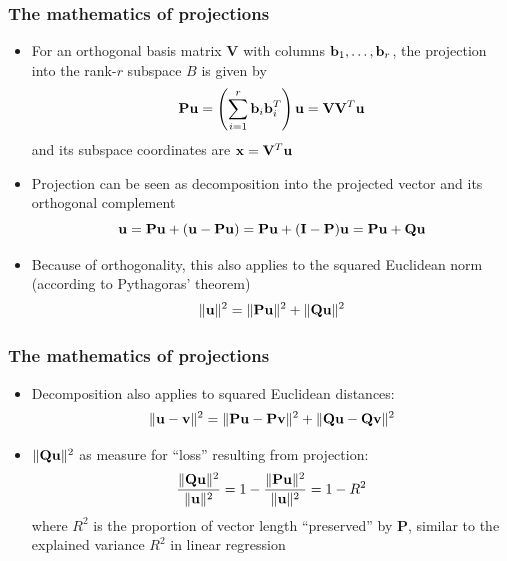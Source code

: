 \documentclass[t]{beamer} %
\begin{document}
\begin{frame}
  \frametitle{The mathematics of projections}

  \begin{itemize}
  \item For an orthogonal basis matrix $\mathbf{V}$ with columns
    $\vb_1, \ldots, \vb_r$, the projection into the rank-$r$ subspace $B$ is
    given by
    \[
      \mathbf{P}\vu = \left(\sum_{i=1}^r \vb_i \vb_i^T\right) \vu
      = \mathbf{V} \mathbf{V}^T \vu
    \]
    and its subspace coordinates are $\vx = \mathbf{V}^T \mathbf{u}$
  \item<2-> Projection can be seen as decomposition into the projected vector
    and its orthogonal complement
    \[
      \vu = \mathbf{P} \vu + (\vu - \mathbf{P} \vu)
      = \mathbf{P} \vu + (\mathbf{I} - \mathbf{P}) \vu
      = \mathbf{P} \vu + \mathbf{Q} \vu
    \]
  \item<3-> Because of orthogonality, this also applies to the squared
    Euclidean norm (according to Pythagoras' theorem)
    \[
      \norm{\vu}^2 = \norm{\mathbf{P} \vu}^2 + \norm{\mathbf{Q} \vu}^2
    \]
  \end{itemize}
\end{frame}

\begin{frame}
  \frametitle{The mathematics of projections}

  \begin{itemize}
  \item Decomposition also applies to squared Euclidean distances:
    \[
      \norm{\vu - \vv}^2 = \norm{\mathbf{P} \vu - \mathbf{P} \vv}^2 + \norm{\mathbf{Q} \vu - \mathbf{Q} \vv}^2
    \]
  \item<2-> $\norm{\mathbf{Q}\vu}^2$ as measure for ``loss'' resulting from projection:
    \[
      \frac{\norm{\mathbf{Q}\vu}^2}{\norm{\vu}^2}
      = 1 - \frac{\norm{\mathbf{P}\vu}^2}{\norm{\vu}^2}
      = 1 - R^2
    \]
    where $R^2$ is the proportion of vector length ``preserved'' by
    $\mathbf{P}$, similar to the explained variance $R^2$ in linear regression
  \end{itemize}  
\end{frame}
\end{document}
